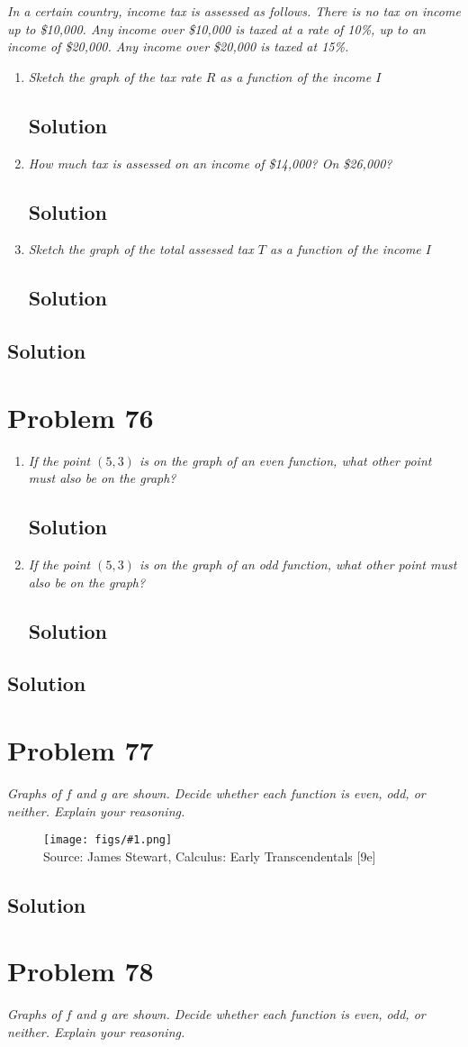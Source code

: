 \documentclass[11pt]{article}
\newcommand{\soln}{\subsection*}
\newcommand{\qn}{\textit}
\newcommand{\imagesource}[1]{{\footnotesize Source: #1}}
\newcommand{\imgqn}[1]{
	\begin{figure}[h]
		\centering
		\texttt{[image: figs/\#1.png]}\\
		\imagesource{James Stewart, Calculus: Early Transcendentals [9e]}
	\end{figure}
}
\begin{document}
\qn{In a certain country, income tax is assessed as follows. There is no tax on income up to \$10,000. Any income over \$10,000 is taxed at a rate of 10\%, up to an income of \$20,000. Any income over \$20,000 is taxed at 15\%.}

\begin{enumerate}
	\item \qn{Sketch the graph of the tax rate $R$ as a function of the income $I$}
	\soln{Solution}
	
	\item \qn{How much tax is assessed on an income of \$14,000? On \$26,000?}
	\soln{Solution}
	
	\item \qn{Sketch the graph of the total assessed tax $T$ as a function of the income $I$}
	\soln{Solution}
\end{enumerate}

\soln{Solution}

\section*{Problem 76}

\begin{enumerate}
	\item \qn{If the point $(5,3)$ is on the graph of an even function, what other point must also be on the graph?}
	\soln{Solution}
	
	\item \qn{If the point $(5,3)$ is on the graph of an odd function, what other point must also be on the graph?}
	\soln{Solution}
\end{enumerate}

\soln{Solution}

\section*{Problem 77}

\qn{Graphs of $f$ and $g$ are shown. Decide whether each function is even, odd, or neither. Explain your reasoning.}

\imgqn{1.1.77}

\soln{Solution}

\section*{Problem 78}

\qn{Graphs of $f$ and $g$ are shown. Decide whether each function is even, odd, or neither. Explain your reasoning.}
\end{document}
